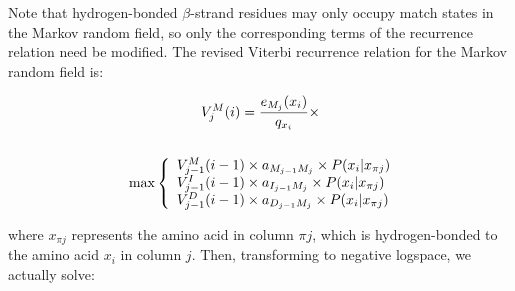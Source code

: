 \documentclass[blockstyle,times,preprint]{sigplanconf}
\begin{document}
Note that hydrogen-bonded $\beta$-strand residues may only occupy match states 
in the Markov random field, so only the corresponding terms of the recurrence
relation need be modified.
The revised Viterbi recurrence relation for the Markov random field is:
\begin{small}
\begin{multline}
V_{j}^{M}(i) = \frac{e_{M_{j}}(x_{i})}{q_{x_{i}}} \times \notag
\\\notag\\ \max \left\{
  \begin{array}{l@{}c@{}l}
  V_{j-1}^{M}(i - 1) \times a_{M_{j-1}M_{j}} \times P(x_{i}|x_{\pi j})\\
  V_{j-1}^{I}(i - 1) \times a_{I_{j-1}M_{j}} \times P(x_{i}|x_{\pi j})\\
  V_{j-1}^{D}(i - 1) \times a_{D_{j-1}M_{j}} \times P(x_{i}|x_{\pi j})\\
  \end{array} \right.\\
\end{multline}
\end{small}
where $x_{\pi j}$ represents the amino acid in column $\pi j$, which is 
hydrogen-bonded to the amino acid $x_{i}$ in column $j$. Then, transforming
to negative logspace, we actually solve: 
\end{document}
